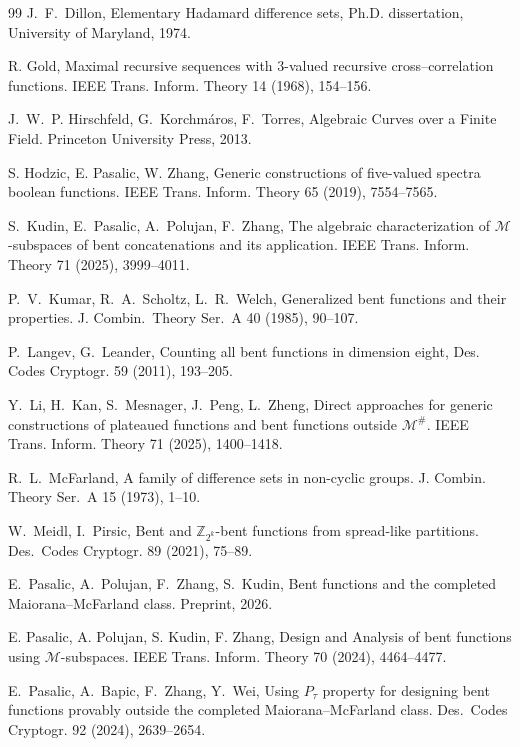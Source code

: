 \documentclass[12pt]{article}
\theoremstyle{plain}
\theoremstyle{definition}
\begin{document}
\begin{thebibliography}{99}
		 J.~F.~Dillon, Elementary Hadamard difference sets,
		Ph.D. dissertation, University of Maryland, 1974.
		
		 R. Gold, Maximal recursive sequences with $3$-valued recursive cross--correlation functions. IEEE Trans. Inform. Theory 14 (1968), 154--156.
		
		 J.~W.~P. Hirschfeld, G.~Korchm{\'a}ros, F.~Torres,
		Algebraic Curves over a Finite Field.
		Princeton University Press, 2013.
		
		 S. Hodzic, E. Pasalic, W. Zhang, Generic constructions of five-valued spectra 
		boolean functions. IEEE Trans. Inform. Theory 65 (2019), 7554--7565.
		
		S.~Kudin, E.~Pasalic, A.~Polujan, F.~Zhang,
		The algebraic characterization of $\mathcal{M}$-subspaces of bent concatenations and its application. IEEE Trans. Inform. Theory 71 (2025), 3999--4011.

		 P.~V.~Kumar, R.~A.~Scholtz, L.~R.~Welch, Generalized bent functions and their properties. J. Combin.\ Theory Ser.~A {40} (1985), 90--107.
		
		 P.~Langev, G.~Leander, Counting all bent functions in dimension eight,
		Des. Codes Cryptogr. 59 (2011), 193--205.
		
		Y.~Li, H.~Kan, S.~Mesnager, J.~Peng, L.~Zheng,
		Direct approaches for generic constructions of plateaued functions
		and bent functions outside $\mathcal{M}^\#$.
		IEEE Trans. Inform. Theory 71 (2025), 1400--1418.
		
		 R.~L.~McFarland, A family of difference sets in non-cyclic groups.
		J. Combin. Theory Ser.~A 15 (1973), 1--10.
		
		 W.~Meidl, I.~Pirsic, Bent and $\mathbb{Z}_{2^k}$-bent functions from spread-like partitions.
		Des.\ Codes Cryptogr. 89 (2021), 75--89.
		
		E.~Pasalic, A.~Polujan, F.~Zhang, S.~Kudin, Bent functions and the completed Maiorana--McFarland class.
		Preprint, 2026.
		
		 E. Pasalic, A. Polujan, S. Kudin, F. Zhang, Design and Analysis of bent functions
		using $\mathcal{M}$-subspaces. IEEE Trans. Inform. Theory 70 (2024), 4464--4477.
		
		E.~Pasalic, A.~Bapic, F.~Zhang, Y.~Wei,
		Using $P_{\tau}$ property for designing bent functions provably
		outside the completed Maiorana--McFarland class.
		Des.\ Codes Cryptogr. 92 (2024), 2639--2654.
		

\end{thebibliography}
\end{document}
